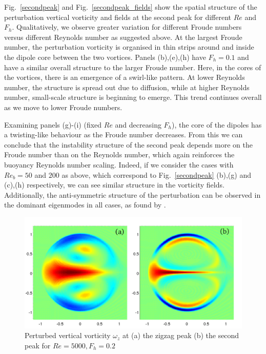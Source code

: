 Fig.~\ref{secondpeak} and Fig.~\ref{secondpeak_fields} show the spatial structure of the perturbation vertical vorticity and fields at the second peak for different $Re$ and $F_{h}$. Qualitatively, we observe greater variation for different Froude numbers versus different Reynolds number as suggested above.  At the largest Froude number, the perturbation vorticity is organised in thin strips around and inside the dipole core between the two vortices. Panels (b),(e),(h) have $F_{h}=0.1$ and have a similar overall structure to the larger Froude number. Here, in the cores of the vortices, there is an emergence of a swirl-like pattern. At lower Reynolds number, the structure is spread out due to diffusion, while at higher Reynolds number, small-scale structure is beginning to emerge. This trend continues overall as we move to lower Froude numbers. 

Examining panels (g)-(i) (fixed $Re$ and decreasing $F_{h}$), the core of the dipoles has a twisting-like behaviour as the Froude number decreases. From this we can conclude that the instability structure of the second peak depends more on the Froude number than on the Reynolds number, which again reinforces the buoyancy Reynolds number scaling.  Indeed, if we consider the cases with $Re_{b}=50$ and $200$ as above, which correspond to Fig.~\ref{secondpeak} (b),(g) and (c),(h) respectively, we can see similar structure in the vorticity fields. Additionally, the anti-symmetric structure of the perturbation can be observed in the dominant eigenmodes in all cases, as found by \cite{bc1999,bc2000c}.

\begin{figure}
\begin{center}
\includegraphics[scale=0.5]{second_peak_vs_zigzag}
\caption{Perturbed vertical vorticity $\omega_{z}$ at (a) the zigzag peak (b) the second peak for $Re=5000, F_{h}=0.2$}
\label{zigzagcomparison}
\end{center}
\end{figure}


